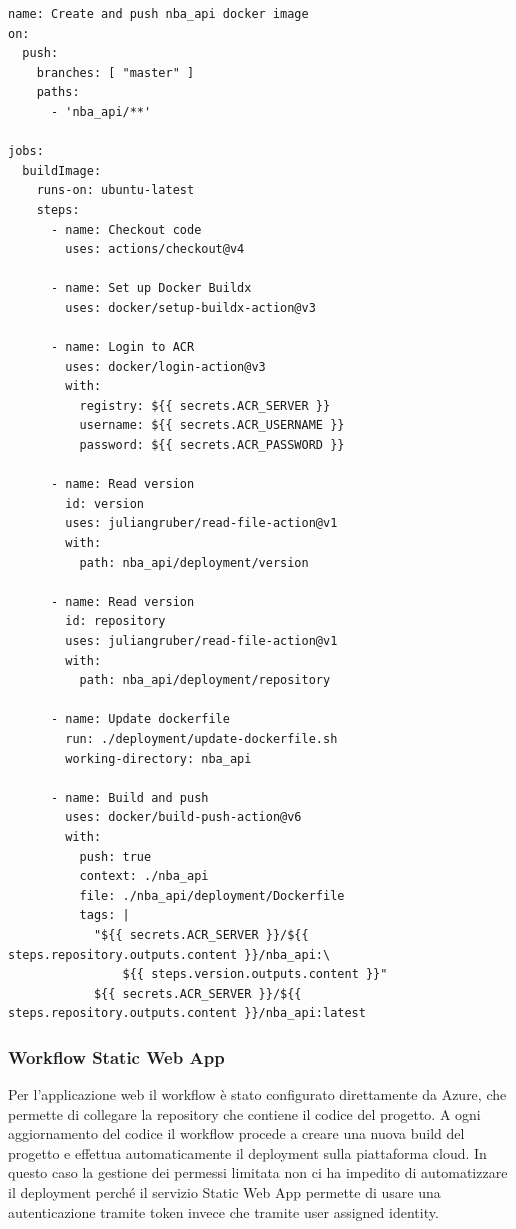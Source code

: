 \begin{verbatim}
name: Create and push nba_api docker image
on:
  push:
    branches: [ "master" ]
    paths:
      - 'nba_api/**'

jobs:
  buildImage:
    runs-on: ubuntu-latest
    steps:
      - name: Checkout code
        uses: actions/checkout@v4

      - name: Set up Docker Buildx
        uses: docker/setup-buildx-action@v3

      - name: Login to ACR
        uses: docker/login-action@v3
        with:
          registry: ${{ secrets.ACR_SERVER }}
          username: ${{ secrets.ACR_USERNAME }}
          password: ${{ secrets.ACR_PASSWORD }}

      - name: Read version
        id: version
        uses: juliangruber/read-file-action@v1
        with:
          path: nba_api/deployment/version

      - name: Read version
        id: repository
        uses: juliangruber/read-file-action@v1
        with:
          path: nba_api/deployment/repository

      - name: Update dockerfile
        run: ./deployment/update-dockerfile.sh
        working-directory: nba_api

      - name: Build and push
        uses: docker/build-push-action@v6
        with:
          push: true
          context: ./nba_api
          file: ./nba_api/deployment/Dockerfile
          tags: |
            "${{ secrets.ACR_SERVER }}/${{ steps.repository.outputs.content }}/nba_api:\
                ${{ steps.version.outputs.content }}"
            ${{ secrets.ACR_SERVER }}/${{ steps.repository.outputs.content }}/nba_api:latest
\end{verbatim}

\subsubsection{Workflow Static Web App}
Per l'applicazione web il workflow è stato configurato direttamente da Azure, che permette di collegare la repository che contiene il codice del progetto. A ogni aggiornamento del codice il workflow procede a creare una nuova build del progetto e effettua automaticamente il deployment sulla piattaforma cloud. In questo caso la gestione dei permessi limitata non ci ha impedito di automatizzare il deployment perché il servizio Static Web App permette di usare una autenticazione tramite token invece che tramite user assigned identity.


